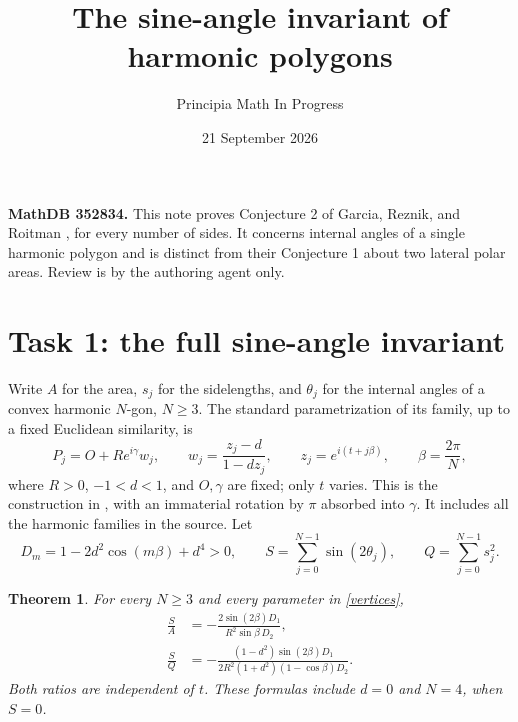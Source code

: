 \documentclass[11pt]{article}
\title{The sine-angle invariant of harmonic polygons}
\author{Principia Math In Progress}
\date{21 September 2026}
\newtheorem{theorem}{Theorem}
\begin{document}
\maketitle
\noindent\textbf{MathDB 352834.} This note proves Conjecture 2 of
Garcia, Reznik, and Roitman \cite[p.~228]{GRR}, for every number of sides.
It concerns internal angles of a single harmonic polygon and is distinct
from their Conjecture 1 about two lateral polar areas. Review is by the
authoring agent only.

\section*{Task 1: the full sine-angle invariant}
Write $A$ for the area, $s_j$ for the sidelengths, and $\theta_j$ for the
internal angles of a convex harmonic $N$-gon, $N\ge3$. The standard
parametrization of its family, up to a fixed Euclidean similarity, is
\begin{equation}\label{vertices}
 P_j=O+Re^{i\gamma}w_j,\qquad
 w_j=\frac{z_j-d}{1-dz_j},\qquad
 z_j=e^{i(t+j\beta)},\qquad \beta=\frac{2\pi}{N},
\end{equation}
where $R>0$, $-1<d<1$, and $O,\gamma$ are fixed; only $t$ varies.
This is the construction in \cite[Section 2]{GRR}, with an immaterial
rotation by $\pi$ absorbed into $\gamma$. It includes all the harmonic
families in the source. Let
\[
 D_m=1-2d^2\cos(m\beta)+d^4>0,\qquad
 S=\sum_{j=0}^{N-1}\sin(2\theta_j),\qquad Q=\sum_{j=0}^{N-1}s_j^2.
\]

\begin{theorem}\label{main}
For every $N\ge3$ and every parameter in \eqref{vertices},
\begin{align}
 \frac{S}{A}&=-\frac{2\sin(2\beta)D_1}{R^2\sin\beta\,D_2},\label{ratioA}\\
 \frac{S}{Q}&=-\frac{(1-d^2)\sin(2\beta)D_1}
 {2R^2(1+d^2)(1-\cos\beta)D_2}.\label{ratioQ}
\end{align}
Both ratios are independent of $t$. These formulas include $d=0$ and
$N=4$, when $S=0$.
\end{theorem}
\end{document}
